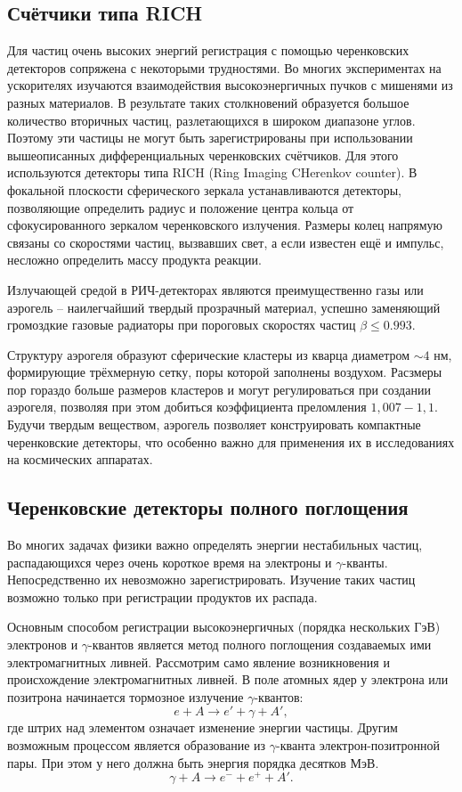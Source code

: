 \begin{Diplom-Main}
	\subsection{Счётчики типа RICH}
	\label{sec:subsection}
	Для частиц очень высоких энергий регистрация с помощью черенковских детекторов сопряжена с некоторыми трудностями.
	Во многих экспериментах на ускорителях изучаются взаимодействия высокоэнергичных пучков с мишенями из разных материалов.
	В результате таких столкновений образуется большое количество вторичных частиц, разлетающихся в широком диапазоне углов.
	Поэтому  эти частицы не могут быть зарегистрированы при использовании вышеописанных дифференциальных черенковских счётчиков.
	Для этого используются детекторы типа RICH (Ring Imaging CHerenkov counter). 
	В фокальной плоскости сферического зеркала устанавливаются детекторы, позволяющие определить радиус и положение центра кольца от сфокусированного зеркалом черенковского излучения. 
	Размеры колец напрямую связаны со скоростями частиц, вызвавших свет, а если известен ещё и импульс, несложно определить массу продукта реакции. 
	
	Излучающей средой в РИЧ-детекторах являются преимущественно газы или аэрогель – наилегчайший твердый прозрачный материал, успешно заменяющий громоздкие газовые радиаторы при пороговых скоростях частиц $\beta \leq 0.993$.
	
	Структуру аэрогеля образуют сферические кластеры из кварца диаметром $ \sim 4 $ нм, формирующие трёхмерную сетку, поры которой заполнены воздухом. 
	Расзмеры пор гораздо больше размеров кластеров и могут регулироваться при создании аэрогеля, позволяя при этом добиться коэффициента преломления $ 1,007 - 1,1 $.
	Будучи твердым веществом, аэрогель позволяет конструировать компактные черенковские детекторы, что особенно важно для применения их в исследованиях на космических аппаратах. 
	
	\subsection{Черенковские детекторы полного поглощения}
	\label{sec:subsection}
	
	Во многих задачах физики важно определять энергии нестабильных частиц, распадающихся через очень короткое время на электроны и $ \gamma $-кванты.
	Непосредственно их невозможно зарегистрировать.
	Изучение таких частиц возможно только при регистрации продуктов их распада.
	
	Основным способом регистрации высокоэнергичных (порядка нескольких ГэВ) электронов и $ \gamma $-квантов является метод полного поглощения создаваемых ими электромагнитных ливней.
	 Рассмотрим само явление возникновения и происхождение электромагнитных ливней. 
	В поле атомных ядер у электрона или позитрона начинается тормозное излучение $\gamma$-квантов: $$e + A \longrightarrow e' + \gamma + A',$$ где штрих над элементом означает изменение энергии частицы. 
	Другим возможным процессом является образование из $
	\gamma$-кванта электрон-позитронной пары.
	При этом у него должна быть энергия порядка десятков МэВ. $$\gamma + A \longrightarrow e^- + e^+ + A'.$$
	

\end{Diplom-Main}
